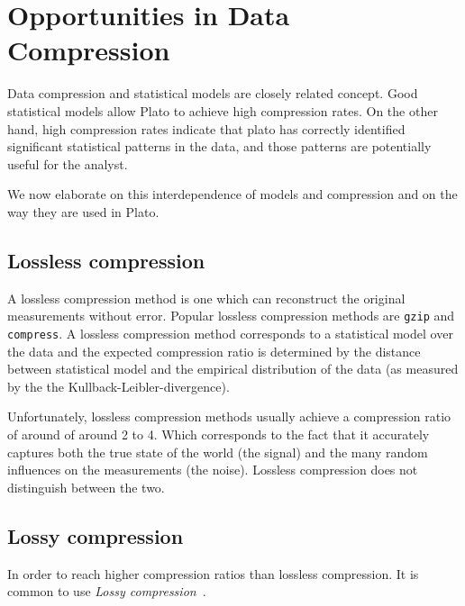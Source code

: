 
\section{Opportunities in Data Compression}
\label{sec:compression}

Data compression and statistical models are closely related
concept. Good statistical models allow Plato to achieve high
compression rates. On the other hand, high compression rates indicate
that plato has correctly identified significant statistical patterns
in the data, and those patterns are potentially useful for the
analyst.

We now elaborate on this interdependence of models and compression and
on the way they are used in Plato.

\subsection{Lossless compression}
A lossless compression method is one which can reconstruct the
original measurements without error. Popular lossless compression
methods are {\tt gzip} and {\tt compress}. A lossless compression
method corresponds to a statistical model over the data and the
expected compression ratio is determined by the distance between
statistical model and the empirical distribution of the data (as
measured by the the Kullback-Leibler-divergence). 

Unfortunately, lossless compression methods usually achieve a
compression ratio of around of around 2 to 4. Which corresponds to the
fact that it accurately captures both the true state of the world (the signal)
and the many random influences on the measurements (the noise). 
Lossless compression does not distinguish between the two.

\newcommand{\vx}{\mathbf{x}}
\newcommand{\hx}{\hat{x}}
\newcommand{\vhx}{\hat{\mathbf{x}}}
\newcommand{\vc}{\mathbf{c}}
\newcommand{\vr}{\mathbf{r}}

\subsection{Lossy compression}
In order to reach higher compression ratios than lossless
compression. It is common to use {\em Lossy compression}~\cite{CompressionBook}.

